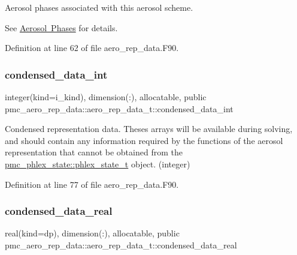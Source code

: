 Aerosol phases associated with this aerosol scheme. 

See \mbox{\hyperlink{phlex_aero_phase}{Aerosol Phases}} for details. 

Definition at line 62 of file aero\+\_\+rep\+\_\+data.\+F90.

\mbox{\label{structpmc__aero__rep__data_1_1aero__rep__data__t_a765bb678b9c7428ca7e3026dfdee287a}} 
\subsubsection{\texorpdfstring{condensed\+\_\+data\+\_\+int}{condensed\_data\_int}}
{\footnotesize\ttfamily integer(kind=i\+\_\+kind), dimension(\+:), allocatable, public pmc\+\_\+aero\+\_\+rep\+\_\+data\+::aero\+\_\+rep\+\_\+data\+\_\+t\+::condensed\+\_\+data\+\_\+int}



Condensed representation data. Theses arrays will be available during solving, and should contain any information required by the functions of the aerosol representation that cannot be obtained from the \mbox{\hyperlink{structpmc__phlex__state_1_1phlex__state__t}{pmc\+\_\+phlex\+\_\+state\+::phlex\+\_\+state\+\_\+t}} object. (integer) 



Definition at line 77 of file aero\+\_\+rep\+\_\+data.\+F90.

\mbox{\label{structpmc__aero__rep__data_1_1aero__rep__data__t_a7dcb494303b1efa6467a162bc279211d}} 
\subsubsection{\texorpdfstring{condensed\+\_\+data\+\_\+real}{condensed\_data\_real}}
{\footnotesize\ttfamily real(kind=dp), dimension(\+:), allocatable, public pmc\+\_\+aero\+\_\+rep\+\_\+data\+::aero\+\_\+rep\+\_\+data\+\_\+t\+::condensed\+\_\+data\+\_\+real}



